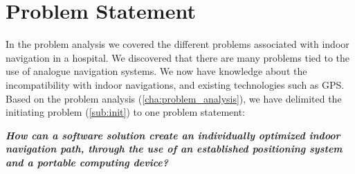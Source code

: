 \chapter{Problem Statement}



In the problem analysis we covered the different problems associated with indoor navigation in a hospital.
We discovered that there are many problems tied to the use of analogue navigation systems. We now have knowledge about the incompatibility with indoor navigations, and existing technologies such as GPS.
Based on the problem analysis (\cref{cha:problem_analysis}), we have delimited the initiating problem (\cref{sub:init}) to one problem statement:


\textit{\textbf{How can a software solution create an individually optimized indoor navigation path, through the use of an established positioning system and a portable computing device?}}